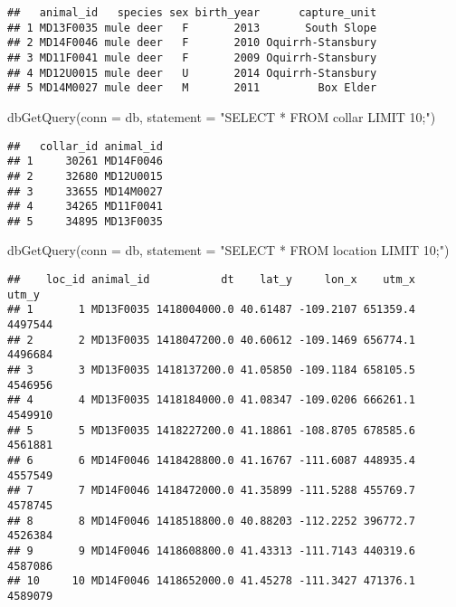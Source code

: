 \documentclass[
]{book}
\newenvironment{Shaded}{\begin{snugshade}}{\end{snugshade}}
\newcommand{\AttributeTok}[1]{\textcolor[rgb]{0.77,0.63,0.00}{#1}}
\newcommand{\FunctionTok}[1]{\textcolor[rgb]{0.00,0.00,0.00}{#1}}
\newcommand{\NormalTok}[1]{#1}
\newcommand{\StringTok}[1]{\textcolor[rgb]{0.31,0.60,0.02}{#1}}
\begin{document}
\begin{verbatim}
##   animal_id   species sex birth_year      capture_unit
## 1 MD13F0035 mule deer   F       2013       South Slope
## 2 MD14F0046 mule deer   F       2010 Oquirrh-Stansbury
## 3 MD11F0041 mule deer   F       2009 Oquirrh-Stansbury
## 4 MD12U0015 mule deer   U       2014 Oquirrh-Stansbury
## 5 MD14M0027 mule deer   M       2011         Box Elder
\end{verbatim}

\begin{Shaded}
\begin{Highlighting}[]
\FunctionTok{dbGetQuery}\NormalTok{(}\AttributeTok{conn =}\NormalTok{ db, }\AttributeTok{statement =} \StringTok{"SELECT * FROM collar LIMIT 10;"}\NormalTok{)}
\end{Highlighting}
\end{Shaded}

\begin{verbatim}
##   collar_id animal_id
## 1     30261 MD14F0046
## 2     32680 MD12U0015
## 3     33655 MD14M0027
## 4     34265 MD11F0041
## 5     34895 MD13F0035
\end{verbatim}

\begin{Shaded}
\begin{Highlighting}[]
\FunctionTok{dbGetQuery}\NormalTok{(}\AttributeTok{conn =}\NormalTok{ db, }\AttributeTok{statement =} \StringTok{"SELECT * FROM location LIMIT 10;"}\NormalTok{)}
\end{Highlighting}
\end{Shaded}

\begin{verbatim}
##    loc_id animal_id           dt    lat_y     lon_x    utm_x   utm_y
## 1       1 MD13F0035 1418004000.0 40.61487 -109.2107 651359.4 4497544
## 2       2 MD13F0035 1418047200.0 40.60612 -109.1469 656774.1 4496684
## 3       3 MD13F0035 1418137200.0 41.05850 -109.1184 658105.5 4546956
## 4       4 MD13F0035 1418184000.0 41.08347 -109.0206 666261.1 4549910
## 5       5 MD13F0035 1418227200.0 41.18861 -108.8705 678585.6 4561881
## 6       6 MD14F0046 1418428800.0 41.16767 -111.6087 448935.4 4557549
## 7       7 MD14F0046 1418472000.0 41.35899 -111.5288 455769.7 4578745
## 8       8 MD14F0046 1418518800.0 40.88203 -112.2252 396772.7 4526384
## 9       9 MD14F0046 1418608800.0 41.43313 -111.7143 440319.6 4587086
## 10     10 MD14F0046 1418652000.0 41.45278 -111.3427 471376.1 4589079
\end{verbatim}
\end{document}
